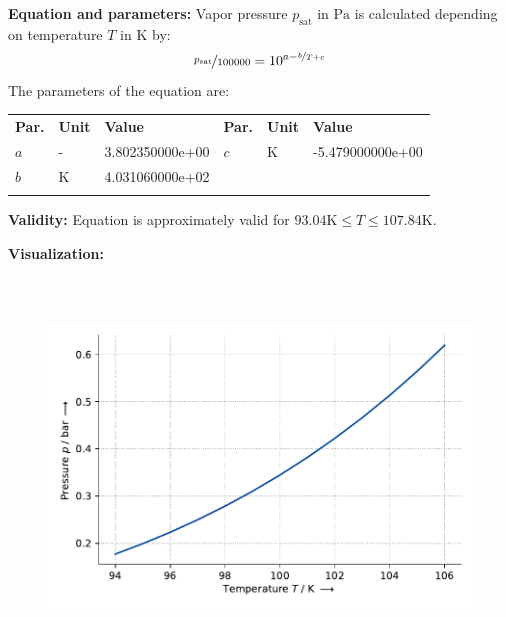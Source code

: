 \textbf{Equation and parameters:}
\newline
%
Vapor pressure $p_\mathrm{sat}$ in $\si{\pascal}$ is calculated depending on temperature $T$ in $\si{\kelvin}$ by:
%
\begin{equation*}
\nicefrac{p_\mathrm{sat}}{100000} = 10^{a - \nicefrac{b}{T + c}}
\end{equation*}
%
The parameters of the equation are:
%
\begin{longtable}[l]{lll|lll}
\toprule
\addlinespace
\textbf{Par.} & \textbf{Unit} & \textbf{Value} &	\textbf{Par.} & \textbf{Unit} & \textbf{Value} \\
\addlinespace
\midrule
\endhead

\bottomrule
\endfoot
\bottomrule
\endlastfoot
\addlinespace

$a$ & - & 3.802350000e+00 & $c$ & $\si{\kelvin}$  & -5.479000000e+00 \\
$b$ & $\si{\kelvin}$ & 4.031060000e+02 & & & \\

\addlinespace\end{longtable}

\textbf{Validity:}
\newline
Equation is approximately valid for $93.04 \si{\kelvin} \leq T \leq 107.84 \si{\kelvin}$.
\newline

\textbf{Visualization:}
%
\begin{figure}[!htp]
{\noindent\includegraphics[height=10cm, keepaspectratio]{figs/ref/ref_Methane_VaporPressure_Antoine_3.pdf}}
\end{figure}
%


